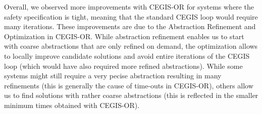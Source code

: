\documentclass[sigconf]{llncs}
\renewcommand{\note}[1]{\textcolor{red}{[#1]}}
\begin{document}
Overall, we observed more improvements with CEGIS-OR for
systems where the safety specification is tight, 
meaning that the standard CEGIS loop would require many iterations.
These improvements are due to the Abstraction Refinement and Optimization in CEGIS-OR.
While abstraction refinement enables us to start with coarse abstractions
that are only refined on demand, 
the optimization
allows to locally improve candidate solutions and avoid entire iterations of the CEGIS loop
(which would have also required more refined abstractions).
While some systems might still require a very pecise
abstraction resulting in many refinements
(this is generally the cause of time-outs in CEGIS-OR),
others allow us to find solutions with rather coarse
abstractions (this is reflected in the smaller minimum
times obtained with CEGIS-OR). 


\end{document}
